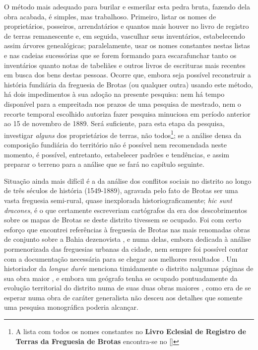 O método mais adequado para burilar e esmerilar esta pedra bruta, fazendo dela obra acabada, é simples, mas trabalhoso. Primeiro, listar os nomes de proprietários, posseiros, arrendatários e quantos mais houver no livro de registro de terras remanescente e, em seguida, vasculhar seus inventários, estabelecendo assim árvores genealógicas; paralelamente, usar os nomes constantes nestas listas e nas cadeias sucessórias que se forem formando para escarafunchar tanto os inventários quanto notas de tabeliães e outros livros de escrituras mais recentes em busca dos bens destas pessoas. Ocorre que, embora seja possível reconstruir a história fundiária da freguesia de Brotas (ou qualquer outra) usando este método, há dois impedimentos à sua adoção na presente pesquisa: nem há tempo disponível para a empreitada nos prazos de uma pesquisa de mestrado, nem o recorte temporal escolhido autoriza fazer pesquisa minuciosa em período anterior ao 15 de novembro de 1889. Será suficiente, para esta etapa da pesquisa, investigar \textit{alguns} dos proprietários de terras, não todos\footnote{A lista com todos os nomes constantes no \textbf{Livro Eclesial de Registro de Terras da Freguesia de Brotas} encontra-se no \autoref{}}; se a análise densa da composição fundiária do território não é possível nem recomendada neste momento, é possível, entretanto, estabelecer padrões e tendências, e assim preparar o terreno para a análise que se fará no capítulo seguinte.

Situação ainda mais difícil é a da análise dos conflitos sociais no distrito ao longo de três séculos de história (1549-1889), agravada pelo fato de Brotas ser uma vasta freguesia semi-rural, quase inexplorada historiograficamente; \textit{hic sunt dracones}, é o que certamente escreveriam cartógrafos da era dos descobrimentos sobre os mapas de Brotas se deste distrito tivessem se ocupado. Foi com certo esforço que encontrei referências à freguesia de Brotas nas mais renomadas obras de conjunto sobre a Bahia dezenovista \cite{MATTOSO1978, MATTOSO1992, NASCIMENTO2007}, e numa delas, embora dedicada à análise pormenorizada das freguesias urbanas da cidade, nem sempre foi possível contar com a documentação necessária para se chegar aos melhores resultados \cite{NASCIMENTO2007}. Um historiador da \textit{longue durée} menciona timidamente o distrito nalgumas páginas de sua obra maior \cite{tavares_historia_2008}, e embora um geógrafo tenha se ocupado pontuadamente da evolução territorial do distrito numa de suas duas obras maiores \cite{VASCONCELOS2002}, como era de se esperar numa obra de caráter generalista não desceu aos detalhes que somente uma pesquisa monográfica poderia alcançar. 

